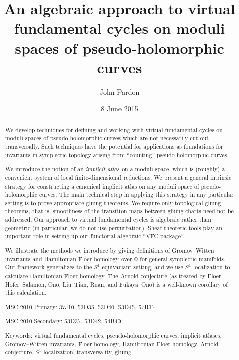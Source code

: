 \documentclass[12pt]{article}
\theoremstyle{definition}
\theoremstyle{remark}
\numberwithin{equation}{subsection}
\newcommand{\QQ}{\mathbb Q}
\begin{document}
\title{An algebraic approach to virtual fundamental cycles on moduli spaces of pseudo-holomorphic curves}

\author{John Pardon}

\date{8 June 2015}

\maketitle

\nocite{luriehttpub}

\begin{abstract}
We develop techniques for defining and working with virtual fundamental cycles on moduli spaces of pseudo-holomorphic curves which are not necessarily cut out transversally.  Such techniques have the potential for applications as foundations for invariants in symplectic topology arising from ``counting'' pseudo-holomorphic curves.

We introduce the notion of an \emph{implicit atlas} on a moduli space, which is (roughly) a convenient system of local finite-dimensional reductions.  We present a general intrinsic strategy for constructing a canonical implicit atlas on any moduli space of pseudo-holomorphic curves.  The main technical step in applying this strategy in any particular setting is to prove appropriate gluing theorems.  We require only topological gluing theorems, that is, smoothness of the transition maps between gluing charts need not be addressed.  Our approach to virtual fundamental cycles is algebraic rather than geometric (in particular, we do not use perturbation).  Sheaf-theoretic tools play an important role in setting up our functorial algebraic ``VFC package''.

We illustrate the methods we introduce by giving definitions of Gromov--Witten invariants and Hamiltonian Floer homology over $\QQ$ for general symplectic manifolds.  Our framework generalizes to the $S^1$-equivariant setting, and we use $S^1$-localization to calculate Hamiltonian Floer homology.  The Arnold conjecture (as treated by Floer, Hofer--Salamon, Ono, Liu--Tian, Ruan, and Fukaya--Ono) is a well-known corollary of this calculation.

MSC 2010 Primary: 37J10, 53D35, 53D40, 53D45, 57R17

MSC 2010 Secondary: 53D37, 53D42, 54B40

Keywords: virtual fundamental cycles, pseudo-holomorphic curves, implicit atlases, Gromov--Witten invariants, Floer homology, Hamiltonian Floer homology, Arnold conjecture, $S^1$-localization, transversality, gluing
\end{abstract}
\end{document}
